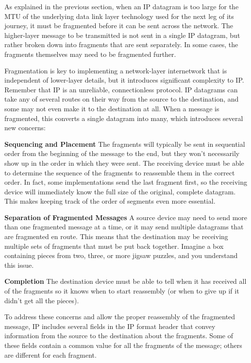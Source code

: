 \documentclass[b5paper,11pt]{memoir}
\begin{document}
\protect\hypertarget{ch22s02.html}{}{}

As explained in the previous section, when an IP datagram is too large
for the MTU of the underlying data link layer technology used for the
next leg of its journey, it must be fragmented before it can be sent
across the network. The higher-layer message to be transmitted is not
sent in a single IP datagram, but rather broken down into fragments that
are sent separately. In some cases, the fragments themselves may need to
be fragmented further.

\protect\hypertarget{ch22s02.htmlux5cux23idx-CHP-22-0807}{}{}Fragmentation
is key to implementing a network-layer internetwork that is independent
of lower-layer details, but it introduces significant complexity to IP.
Remember that IP is an unreliable, connectionless protocol. IP datagrams
can take any of several routes on their way from the source to the
destination, and some may not even make it to the destination at all.
When a message is fragmented, this converts a single datagram into many,
which introduces several new concerns:

{\textbf{Sequencing and Placement}} The fragments will typically be sent
in sequential order from the beginning of the message to the end, but
they won't necessarily show up in the order in which they were sent. The
receiving device must be able to determine the sequence of the fragments
to reassemble them in the correct order. In fact, some implementations
send the last fragment first, so the receiving device will immediately
know the full size of the original, complete datagram. This makes
keeping track of the order of segments even more essential.

{\textbf{Separation of Fragmented Messages}} A source device may need to
send more than one fragmented message at a time, or it may send multiple
datagrams that are fragmented en route. This means that the destination
may be receiving multiple sets of fragments that must be put back
together. Imagine a box containing pieces from two, three, or more
jigsaw puzzles, and you understand this issue.

{\textbf{Completion}} The destination device must be able to tell when
it has received all of the fragments so it knows when to start
reassembly (or when to give up if it didn't get all the pieces).

To address these concerns and allow the proper reassembly of the
fragmented message, IP includes several fields in the IP format header
that convey information from the source to the destination about the
fragments. Some of these fields contain a common value for all the
fragments of the message; others are different for each fragment.
\end{document}
